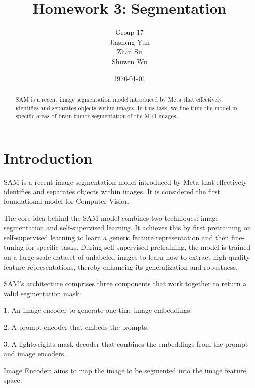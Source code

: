 \documentclass[12pt, a4paper, oneside]{article}
\title{\textbf{Homework 3: Segmentation}}
\author{Group 17 \\ Jiasheng Yun \quad 521030910093 \\ Zhan Su \quad 521030910112 \\ Shuwen Wu \quad 521030910087}
\author{
    \IEEEauthorblockN{Jiasheng Yun\textsuperscript{1}}
    \IEEEauthorblockA{\textit{521030910093}}
    \and
    \IEEEauthorblockN{Zhan Su\textsuperscript{2}}
    \IEEEauthorblockA{\textit{521030910112}}
    \and
    \IEEEauthorblockN{Shuwen Wu\textsuperscript{3}}
    \IEEEauthorblockA{\textit{521030910087}}
}
\date{\today}
\begin{document}
\maketitle

\setcounter{page}{0}
\maketitle
\thispagestyle{empty}

\begin{abstract}
    SAM\cite{2023arXiv230402643K} is a recent image segmentation model introduced by Meta that effectively identifies and separates objects within images. In this task, we fine-tune the model in specific areas of brain tumor segmentation of the MRI images.

\end{abstract}

\newpage
{}
\setcounter{page}{1}
\tableofcontents
\newpage
\setcounter{page}{1}

\section{Introduction}

SAM is a recent image segmentation model introduced by Meta that effectively identifies and separates objects within images.  It is considered the first foundational model for Computer Vision.


The core idea behind the SAM model combines two techniques: image segmentation and self-supervised learning. It achieves this by first pretraining on self-supervised learning to learn a generic feature representation and then fine-tuning for specific tasks. During self-supervised pretraining, the model is trained on a large-scale dataset of unlabeled images to learn how to extract high-quality feature representations, thereby enhancing its generalization and robustness.

SAM’s architecture comprises three components that work together to return a valid segmentation mask:

1. An image encoder to generate one-time image embeddings.

2. A prompt encoder that embeds the prompts.

3. A lightweights mask decoder that combines the embeddings from the prompt and image encoders.

Image Encoder:  aims to map the image to be segmented into the image feature space.
\end{document}
